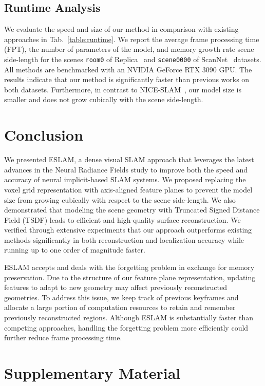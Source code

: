 \subsection{Runtime Analysis} \label{sec:c4_runtime}
We evaluate the speed and size of our method in comparison with existing approaches in Tab.~\ref{table:runtime}. We report the average frame processing time (FPT), the number of parameters of the model, and memory growth rate \wrt scene side-length for the scenes \texttt{room0} of Replica~\cite{replica19arxiv} and \texttt{scene0000} of ScanNet~\cite{dai2017scannet} datasets. All methods are benchmarked with an NVIDIA GeForce RTX 3090 GPU. The results indicate that our method is significantly faster than previous works on both datasets. Furthermore, in contrast to NICE-SLAM~\cite{zhu2022nice}, our model size is smaller and does not grow cubically with the scene side-length.

\section{Conclusion}
We presented ESLAM, a dense visual SLAM approach that leverages the latest advances in the Neural Radiance Fields study to improve both the speed and accuracy of neural implicit-based SLAM systems. We proposed replacing the voxel grid representation with axis-aligned feature planes to prevent the model size from growing cubically with respect to the scene side-length. We also demonstrated that modeling the scene geometry with Truncated Signed Distance Field (TSDF) leads to efficient and high-quality surface reconstruction. We verified through extensive experiments that our approach outperforms existing methods significantly in both reconstruction and localization accuracy while running up to one order of magnitude faster.

ESLAM accepts and deals with the forgetting problem in exchange for memory preservation. Due to the structure of our feature plane representation, updating features to adapt to new geometry may affect previously reconstructed geometries. To address this issue, we keep track of previous keyframes and allocate a large portion of computation resources to retain and remember previously reconstructed regions. Although ESLAM is substantially faster than competing approaches, handling the forgetting problem more efficiently could further reduce frame processing time.

\clearpage

\section{Supplementary Material}

